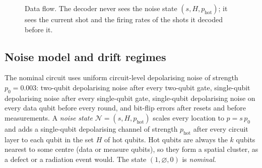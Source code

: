 \documentclass[11pt,a4paper]{article}
\begin{document}
\begin{figure}[t]
\centering
{}
\caption{Data flow. The decoder never sees the noise state $(s,H,p_{\mathrm{hot}})$; it sees the current shot and
the firing rates of the shots it decoded before it.}
\label{fig:pipeline}
\end{figure}

\subsection{Noise model and drift regimes}\label{sec:noise}
The nominal circuit uses uniform circuit-level depolarising noise of strength $p_0=0.003$: two-qubit
depolarising noise after every two-qubit gate, single-qubit depolarising noise after every single-qubit gate,
single-qubit depolarising noise on every data qubit before every round, and bit-flip errors after resets and before measurements. A \emph{noise state}
$\mathcal N=(s,H,p_{\mathrm{hot}})$ scales every location to $p=s\,p_0$ and adds a single-qubit depolarising
channel of strength $p_{\mathrm{hot}}$ after every circuit layer to each qubit in the set $H$ of hot qubits. Hot
qubits are always the $k$ qubits nearest to some centre (data or measure qubits), so they form a spatial cluster, as a defect or a
radiation event would. The state $(1,\varnothing,0)$ is \emph{nominal}.
\end{document}
